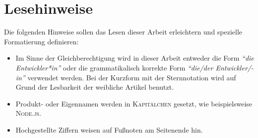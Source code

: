 \chapter*{Lesehinweise}
Die folgenden Hinweise sollen das Lesen dieser Arbeit erleichtern und spezielle Formatierung definieren:

\begin{itemize}
	\item Im Sinne der Gleichberechtigung wird in dieser Arbeit entweder die Form \textit{\enquote{die Entwickler*in}} oder die grammatikalisch korrekte Form \textit{\enquote{die/der Entwickler/-in}} verwendet werden. Bei der Kurzform mit der Sternnotation wird auf Grund der Lesbarkeit der weibliche Artikel benutzt.
	\item Produkt- oder Eigennamen werden in \textsc{Kapitälchen} gesetzt, wie beispielsweise \textsc{Node.js}.
	\item Hochgestellte Ziffern weisen auf Fußnoten am Seitenende hin.
	
\end{itemize}
 